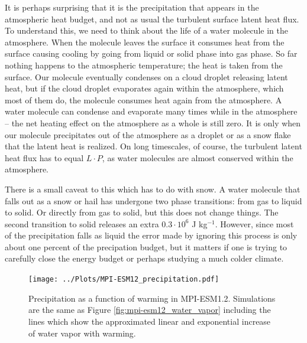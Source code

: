 \documentclass[12pt]{book}
\begin{document}
It is perhaps surprising that it is the precipitation that appears in the atmospheric heat budget, and not as usual the turbulent surface latent heat flux. To understand this, we need to think about the life of a water molecule in the atmosphere. When the molecule leaves the surface it consumes heat from the surface causing cooling by going from liquid or solid phase into gas phase. So far nothing happens to the atmospheric temperature; the heat is taken from the surface. Our molecule eventually condenses on a cloud droplet releasing latent heat, but if the cloud droplet evaporates again within the atmosphere, which most of them do, the molecule consumes heat again from the atmosphere. A water molecule can condense and evaporate many times while in the atmosphere -- the net heating effect on the atmosphere as a whole is still zero. It is only when our molecule precipitates out of the atmosphere as a droplet or as a snow flake that the latent heat is realized. On long timescales, of course, the turbulent latent heat flux has to equal $L\cdot P$, as water molecules are almost conserved within the atmosphere.

There is a small caveat to this which has to do with snow. A water molecule that falls out as a snow or hail has undergone two phase transitions: from gas to liquid to solid. Or directly from gas to solid, but this does not change things. The second transition to solid releases an extra $0.3\cdot 10^6$ J kg$^{-1}$. However, since most of the precipitation falls as liquid the error made by ignoring this process is only about one percent of the precipation budget, but it matters if one is trying to carefully close the energy budget or perhaps studying a much colder climate.

\begin{figure}
\begin{center}
\texttt{[image: ../Plots/MPI-ESM12\_precipitation.pdf]}
\end{center}
\caption{ Precipitation as a function of warming in MPI-ESM1.2. Simulations are the same as Figure \ref{fig:mpi-esm12_water_vapor} including the lines which show the approximated linear and exponential increase of water vapor with warming. } 
\label{fig:mpi-esm12_precipitation}
\end{figure}
\end{document}

